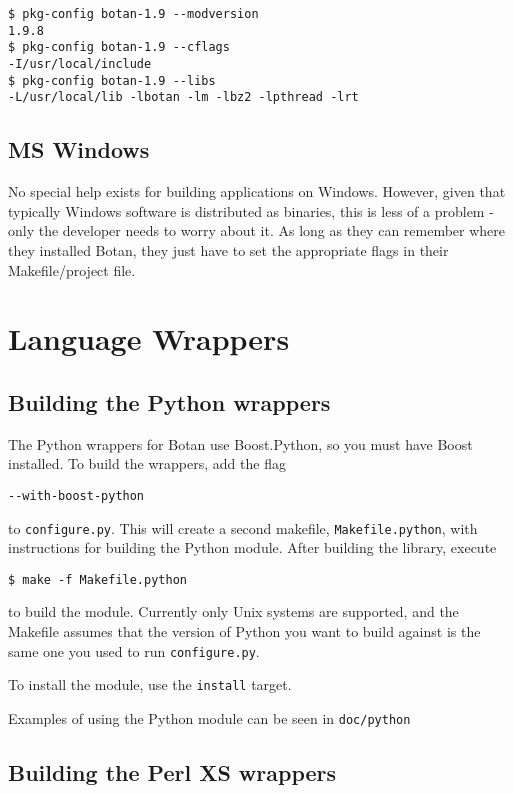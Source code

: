 \documentclass{article}
\newcommand{\filename}[1]{\texttt{#1}}
\begin{document}
\begin{verbatim}
$ pkg-config botan-1.9 --modversion
1.9.8
$ pkg-config botan-1.9 --cflags
-I/usr/local/include
$ pkg-config botan-1.9 --libs
-L/usr/local/lib -lbotan -lm -lbz2 -lpthread -lrt
\end{verbatim}

\subsection{MS Windows}

No special help exists for building applications on Windows. However,
given that typically Windows software is distributed as binaries, this
is less of a problem - only the developer needs to worry about it. As
long as they can remember where they installed Botan, they just have
to set the appropriate flags in their Makefile/project file.

\section{Language Wrappers}

\subsection{Building the Python wrappers}

The Python wrappers for Botan use Boost.Python, so you must have Boost
installed. To build the wrappers, add the flag

\verb|--with-boost-python|

to \verb|configure.py|. This will create a second makefile,
\verb|Makefile.python|, with instructions for building the Python
module. After building the library, execute

\begin{verbatim}
$ make -f Makefile.python
\end{verbatim}

to build the module. Currently only Unix systems are supported, and
the Makefile assumes that the version of Python you want to build
against is the same one you used to run \verb|configure.py|.

To install the module, use the \verb|install| target.

Examples of using the Python module can be seen in \filename{doc/python}

\subsection{Building the Perl XS wrappers}
\end{document}
